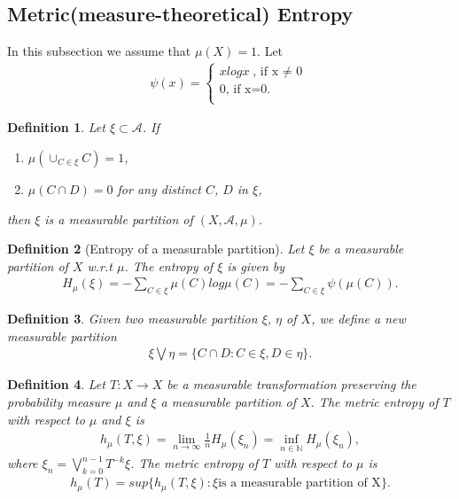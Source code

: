 \documentclass[a4paper,10pt]{amsart}
\newtheorem{definition}{Definition}[section]
\newcommand{\A}{\mathcal{A}}
\newcommand{\N}{\mathbb N} %
\begin{document}
\subsection{Metric(measure-theoretical) Entropy}
In this subsection we assume that $\mu(X) = 1$.
Let
\begin{align*}
    \psi(x) = \begin{cases}
    xlogx  \mbox{, if x $\neq$ 0}\\
    0  \mbox{, if x=0.}\\
  \end{cases} 
\end{align*}

\begin{definition}
   Let $\xi \subset \A$. If
   \begin{enumerate}
       \item $\mu(\cup_{C \in \xi} C) = 1$,
       \item $\mu(C \cap D) = 0$ for any distinct $C$, $D$ in $\xi$,
   \end{enumerate}
   then $\xi$ is a measurable partition of $(X, \A, \mu)$.
\end{definition}

\begin{definition}[Entropy of a measurable partition]
   Let $\xi$ be a measurable partition of $X$ w.r.t $\mu$. The
   entropy of $\xi$ is given by
   \begin{align*}
       H_{\mu}(\xi) = -\sum_{C \in \xi}\mu(C)log\mu(C)
       = -\sum_{C \in \xi}\psi(\mu(C)).
   \end{align*}
\end{definition}

\begin{definition}
   Given two measurable partition $\xi$, $\eta$ of $X$, we 
   define a new measurable partition
   \begin{align*}
       \xi \bigvee \eta = \{C \cap D: C\in \xi, D \in \eta \}. 
   \end{align*}
\end{definition}

\begin{definition}
   Let $T: X \rightarrow X$ be a measurable transformation preserving 
   the probability measure $\mu$ and $\xi$ a measurable partition of $X$.
   The metric entropy of $T$ with respect to $\mu$ and $\xi$ is 
   \begin{align*}
       h_{\mu}(T, \xi) = \lim_{n \rightarrow \infty} \frac{1}{n}H_{\mu}(\xi_n)
       = \inf_{n \in \N} H_{\mu}(\xi_n),
   \end{align*}
   where $\xi_n = \bigvee_{k=0}^{n-1} T^{-k}\xi$.
   The metric entropy of $T$ with respect to $\mu$ is 
   \begin{align*}
       h_{\mu}(T) = sup\{h_{\mu}(T, \xi): \xi 
       \mbox{is  a measurable partition of X} \}. 
   \end{align*}
\end{definition}
\end{document}
